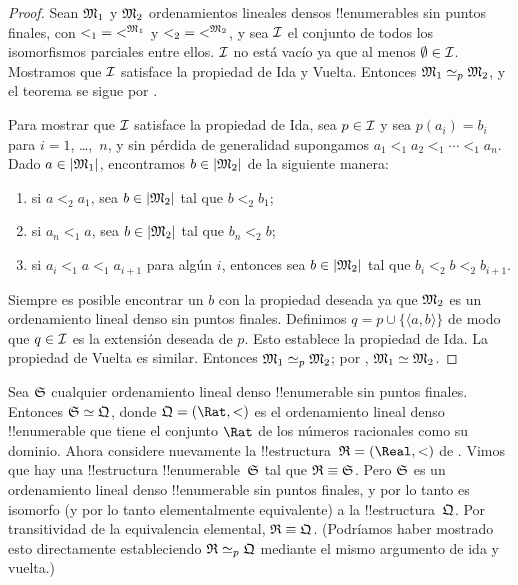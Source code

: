 \documentclass[../../../include/open-logic-section]{subfiles}
\begin{document}
\begin{proof}
  Sean $\Struct{M_1}$ y $\Struct{M_2}$ ordenamientos lineales densos !!{enumerables} sin puntos finales, con ${<_1} = \Assign{<}{M_1}$ y ${<_2} = \Assign{<}{M_2}$, y sea $\mathcal{I}$ el conjunto de todos los isomorfismos parciales entre ellos. $\mathcal{I}$ no está vacío ya que al menos $\emptyset \in \mathcal{I}$. Mostramos que $\mathcal{I}$ satisface la propiedad de Ida y Vuelta. Entonces $\Struct{M_1} \iso[p] \Struct{M_2}$, y el teorema se sigue por .

  Para mostrar que $\mathcal{I}$ satisface la propiedad de Ida, sea $p \in \mathcal{I}$ y sea $p(a_i) = b_i$ para $i = 1$, \dots,~$n$, y sin pérdida de generalidad supongamos $a_1 <_1 a_2 <_1 \cdots <_1 a_n$. Dado $a \in \Domain{M_1}$, encontramos $b \in \Domain{M_2}$ de la siguiente manera:
  \begin{enumerate}
  \item si $a <_2 a_1$, sea $b \in \Domain{M_2}$ tal que $b <_2 b_1$;
  \item si $a_n <_1 a$, sea $b \in \Domain{M_2}$ tal que $b_n <_2 b$;
  \item si $a_i <_1 a <_1 a_{i+1}$ para algún $i$, entonces sea $b \in \Domain{M_2}$ tal que $b_i <_2 b <_2 b_{i+1}$.
  \end{enumerate}
  Siempre es posible encontrar un $b$ con la propiedad deseada ya que $\Struct{M_2}$ es un ordenamiento lineal denso sin puntos finales. Definimos $q = p \cup \{ \langle a, b \rangle \}$ de modo que $q \in \mathcal{I}$ es la extensión deseada de $p$. Esto establece la propiedad de Ida. La propiedad de Vuelta es similar. Entonces $\Struct{M_1} \iso[p] \Struct{M_2}$; por , $\Struct{M_1} \iso \Struct{M_2}$.
\end{proof}

\begin{rem}
  Sea $\Struct{S}$ cualquier ordenamiento lineal denso !!{enumerable} sin puntos finales. Entonces %
  $\Struct{S} \iso \Struct{Q}$, donde $\Struct{Q} = (\Rat, <)$ es el ordenamiento lineal denso !!{enumerable} que tiene el conjunto $\Rat$ de los números racionales como su dominio. Ahora considere nuevamente la !!{estructura}~$\Struct{R} = (\Real, <)$ de . Vimos que hay una !!{estructura} !!{enumerable}~$\Struct{S}$ tal que $\Struct{R} \elemequiv \Struct{S}$. Pero $\Struct{S}$ es un ordenamiento lineal denso !!{enumerable} sin puntos finales, y por lo tanto es isomorfo (y por lo tanto elementalmente equivalente) a la !!{estructura}~$\Struct{Q}$. Por transitividad de la equivalencia elemental, $\Struct{R} \elemequiv \Struct{Q}$. (Podríamos haber mostrado esto directamente estableciendo $\Struct{R} \iso[p] \Struct{Q}$ mediante el mismo argumento de ida y vuelta.)
\end{rem}
\end{document}

